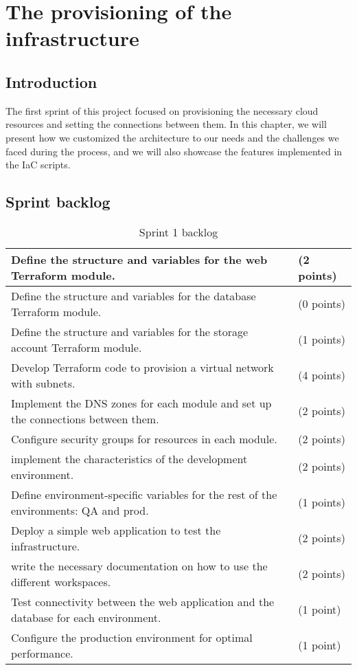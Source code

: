 \chapter{The provisioning of the infrastructure}

\section*{Introduction}
\noindent
The first sprint of this project focused on provisioning the necessary cloud resources and setting the connections between them. In this chapter, we will present how we customized the architecture to our needs and the challenges we faced during the process, and we will also showcase the features implemented in the IaC scripts.

\section{Sprint backlog}
\begin{longtable}[c]{
    |p{}|
    p{}|
    }
    \caption{Sprint 1 backlog}
    \label{tab:Sprint1_backlog}                                                                       \\
    \hline
    Define the structure and variables for the web Terraform module.                     & (2 points) \\
    \hline
    Define the structure and variables for the database Terraform module.                & (0 points) \\
    \hline
    Define the structure and variables for the storage account Terraform module.         & (1 points) \\
    \hline
    Develop Terraform code to provision a virtual network with subnets.                  & (4 points) \\
    \hline
    Implement the DNS zones for each module and set up the connections between them.     & (2 points) \\
    \hline
    Configure security groups for resources in each module.                              & (2 points) \\
    \hline
    implement the characteristics of the development environment.                        & (2 points) \\
    \hline
    Define environment-specific variables for the rest of the environments: QA and prod. & (1 points) \\
    \hline
    Deploy a simple web application to test the infrastructure.                          & (2 points) \\
    \hline
    write the necessary documentation on how to use the different workspaces.            & (2 points) \\
    \hline
    Test connectivity between the web application and the database for each environment. & (1 point)  \\
    \hline
    Configure the production environment for optimal performance.                        & (1 point)  \\
    \hline
\end{longtable}

